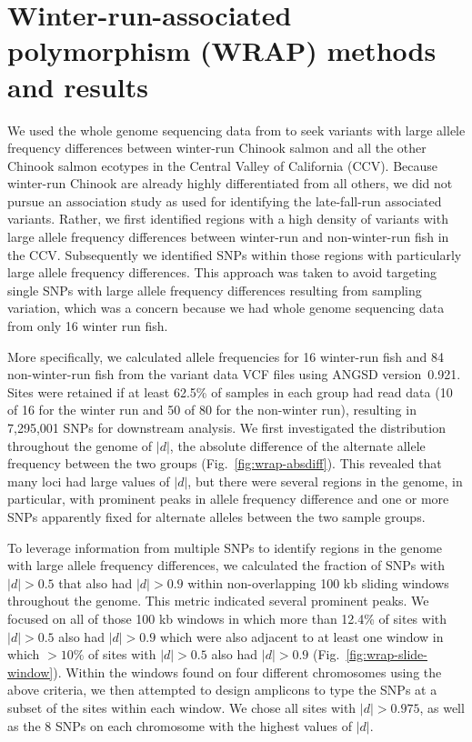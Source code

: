 
\section{Winter-run-associated polymorphism (WRAP) methods and results\label{sec:wrap-methods}}

We used the whole genome sequencing data from \citet{thompson2020complex} to seek variants with
large allele frequency differences between winter-run Chinook salmon and all the other
Chinook salmon ecotypes in the Central Valley of California (CCV).  Because winter-run Chinook are
already highly differentiated from all others, we did not pursue an association study as used
for identifying the late-fall-run associated variants.  Rather, we first identified regions with a high
density of variants with large allele frequency differences between winter-run and non-winter-run
fish in the CCV\@. Subsequently we identified SNPs within those regions with particularly
large allele frequency differences.  This approach was taken to avoid targeting single SNPs
with large allele frequency differences resulting from sampling variation, which was a
concern because we had whole genome sequencing data from only 16 winter run fish.

More specifically, we calculated allele frequencies for 16 winter-run fish and 84 non-winter-run
fish from the  \citet{thompson2020complex} variant data VCF files using ANGSD version~0.921.
Sites were retained if at least 62.5\% of samples in each group had read data (10 of 16 for the
winter run and 50 of 80 for the non-winter run), resulting in 7,295,001 SNPs for downstream
analysis.  We first investigated the distribution throughout the genome of $|d|$, the absolute difference
of the alternate allele frequency between the two groups  (Fig.~\ref{fig:wrap-absdiff}). This revealed
that many loci had large values of $|d|$, but there were several
regions in the genome, in particular, with prominent peaks in allele frequency difference and one
or more SNPs apparently fixed for alternate alleles between the two sample groups.  

To leverage information from multiple SNPs to identify regions in the genome with large
allele frequency differences, we calculated the fraction of SNPs with $|d| > 0.5$ that also
had $|d| > 0.9$ within non-overlapping 100 kb sliding windows throughout the genome. This metric indicated
several prominent peaks.  We focused on all of those
100 kb windows in which more than 12.4\% of sites with $|d|>0.5$ also had $|d|>0.9$ which were
also adjacent to at least one window in which $>10\%$ of sites with $|d|>0.5$ also had $|d|>0.9$ 
(Fig.~\ref{fig:wrap-slide-window}).  Within the windows found on four different chromosomes using
the above criteria, we then attempted to design amplicons to type the SNPs at a subset of the sites
within each window.  We chose all sites with $|d|>0.975$, as well as the 8 SNPs on each chromosome
with the highest values of $|d|$.  

